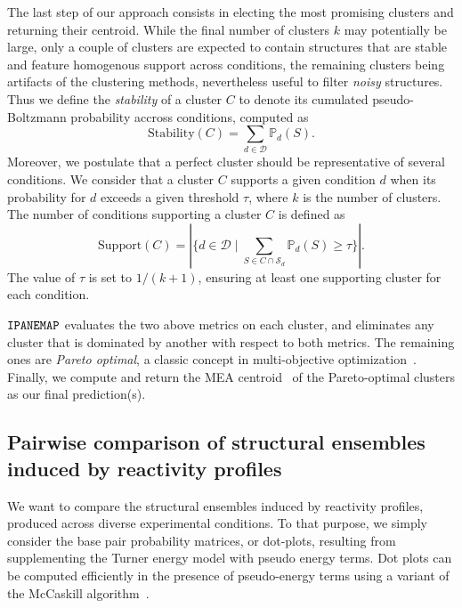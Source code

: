\documentclass[a4,center,fleqn]{NAR}
\newcommand{\Software}[1]{$\text{\ttfamily #1}$}
\newcommand{\OurTool}{\Software{IPANEMAP}\xspace}
\newcommand{\NumClust}{k}
\newcommand{\Def}[1]{{\em #1}}
\begin{document}
The last step of our approach consists in electing the most promising clusters and returning their centroid. While the final number of clusters $\NumClust$ may potentially be large, only a couple of clusters are expected to contain structures that are stable and feature homogenous support across conditions, the remaining clusters being artifacts of the clustering methods, nevertheless useful to filter \emph{noisy} structures. Thus we define the \Def{stability} of a cluster $C$ to denote its cumulated pseudo-Boltzmann probability accross conditions, computed as 
$$\text{Stability}(C) = \sum_{d\in \mathcal{D}} \mathbb{P}_d(S).$$
Moreover, we postulate that a perfect cluster should be representative of several conditions. We consider that a cluster $C$ supports a given condition $d$ when its probability for $d$ exceeds a given threshold $\tau$, where $\NumClust$ is the number of clusters. The number of conditions supporting a cluster $C$ is defined as
$$ \text{Support}(C) = |\{d\in \mathcal{D} \mid \sum_{S\in C\cap \mathcal{S}_d} \mathbb{P}_d(S)\ge \tau \}|.$$
The value of $\tau$ is set to $1/(\NumClust+1)$, ensuring at least one supporting cluster for each condition.

\OurTool evaluates the two above metrics on each cluster, and eliminates any cluster that is dominated by another with respect to both metrics. The remaining ones are \Def{Pareto optimal}, a classic concept in multi-objective optimization~\cite{Mattson2005}. Finally, we compute and return the MEA centroid~\citep{Lu2009} of the Pareto-optimal clusters as our final prediction(s).



\subsection{Pairwise comparison of structural ensembles induced by reactivity profiles}\label{sec:dotplots}

We want to compare the structural ensembles induced by reactivity profiles, produced across diverse experimental conditions. To that purpose, we simply consider the base pair probability matrices, or dot-plots, resulting from supplementing the Turner energy model with pseudo energy terms. %
Dot plots can be computed efficiently in the presence of pseudo-energy terms using a variant of the McCaskill algorithm~\citep{McCaskill1990}.

\end{document}
